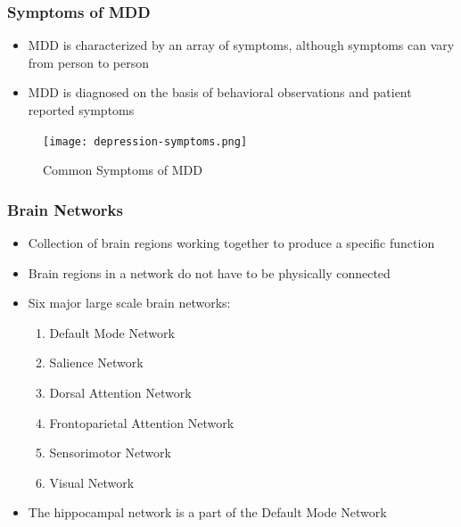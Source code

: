 \documentclass{beamer}
\begin{document}
  \begin{frame}[t]
    \frametitle{Symptoms of MDD}

    \begin{itemize}

    \item MDD is characterized by an array of symptoms, although
      symptoms can vary from person to person \vskip 5pt

    \item MDD is diagnosed on the basis of behavioral observations and
      patient reported symptoms

    \end{itemize}

    \begin{figure}[H]
      \centering
      \texttt{[image: depression-symptoms.png]}
      \caption{Common Symptoms of MDD}
    \end{figure}

  \end{frame}

  \begin{frame}[t]
    \frametitle{Brain Networks}

    \vskip 10pt

    \begin{itemize}
      \item Collection of brain regions working together to produce
        a specific function \vskip 5pt

      \item Brain regions in a network do not have to be physically connected
        \vskip 5pt

      \item Six major large scale brain networks:
        \vskip 5pt
        \begin{enumerate}
          \item Default Mode Network
          \item Salience Network
          \item Dorsal Attention Network
          \item Frontoparietal Attention Network
          \item Sensorimotor Network
          \item Visual Network
        \end{enumerate}
        \vskip 5pt

      \item The hippocampal network is a part of the Default Mode
        Network


    \end{itemize}

  \end{frame}
\end{document}

